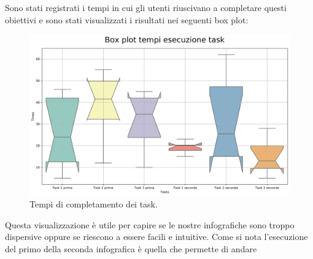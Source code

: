\documentclass[10pt, a4paper,openany]{article}
\begin{document}
Sono stati registrati i tempi in cui gli utenti riuscivano a completare questi obiettivi e sono stati visualizzati i risultati nei seguenti box plot:
\begin{figure}[H]
	\centering
	\includegraphics[height=0.5 \linewidth]{../quality/tempi_box_plot_seaborn.png}
	\caption{Tempi di completamento dei task.}
\end{figure}
Questa visualizzazione è utile per capire se le nostre infografiche sono troppo dispersive oppure se riescono a essere facili e intuitive. Come si nota l'esecuzione del primo della seconda infografica è quella che permette di andare 
\end{document}
